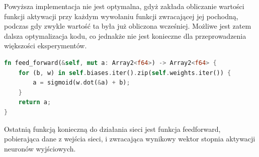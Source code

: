 \documentclass[12pt,twoside]{article}
\begin{document}
Powyższa implementacja nie jest optymalna, gdyż zakłada obliczanie wartości funkcji aktywacji przy każdym wywołaniu funkcji zwracającej jej pochodną, podczas gdy zwykle wartość ta była już obliczona wcześniej.
Możliwe jest zatem dalsza optymalizacja kodu, co jednakże nie jest konieczne dla przeprowadzenia większości eksperymentów.


\begin{lstlisting}[language=Rust,caption=Realizacja funkcji feed-forward,label={lst:feedforward}]
fn feed_forward(&self, mut a: Array2<f64>) -> Array2<f64> {
	for (b, w) in self.biases.iter().zip(self.weights.iter()) {
		a = sigmoid(w.dot(&a) + b);
	}
	return a;
}
\end{lstlisting}

Ostatnią funkcją konieczną do działania sieci jest funkcja feedforward, pobierająca dane z wejścia sieci, i zwracająca wynikowy wektor stopnia aktywacji neuronów wyjściowych.
\end{document}
